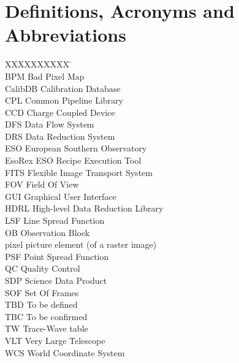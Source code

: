 \section{Definitions, Acronyms and Abbreviations}
\label{sec:acronyms}

\begin{tabbing}
XXXXXXXXXX \= \kill \\
BPM    \> Bad Pixel Map \\
CalibDB    \> Calibration Database \\
CPL        \> Common Pipeline Library \\
CCD        \> Charge Coupled Device \\
DFS        \> Data Flow System \\
DRS        \> Data Reduction System \\
ESO        \> European Southern Observatory \\
EsoRex     \> ESO Recipe Execution Tool \\
FITS       \> Flexible Image Transport System \\
FOV        \> Field Of View \\
GUI        \> Graphical User Interface \\
HDRL        \> High-level Data Reduction Library \\
LSF        \> Line Spread Function \\
OB        \> Observation Block \\
pixel     \> picture element (of a raster image) \\
PSF       \> Point Spread Function \\
QC        \> Quality Control \\
SDP       \> Science Data Product \\
SOF       \> Set Of Frames \\
TBD       \> To be defined \\
TBC       \> To be confirmed \\
TW       \> Trace-Wave table \\
VLT       \> Very Large Telescope \\
WCS       \> World Coordinate System \\
\end{tabbing}
